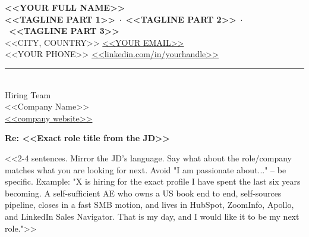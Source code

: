 \documentclass[11pt, letterpaper]{article}
\begin{document}
\begin{center}
  {\huge\bfseries\color{darkgray} <<YOUR FULL NAME>>}\\[4pt]
  {\small\color{medgray}
    \textbf{<<TAGLINE PART 1>>}~$\cdot$~\textbf{<<TAGLINE PART 2>>}~$\cdot$~\textbf{<<TAGLINE PART 3>>}
  }\\[4pt]
  {\small\color{medgray}
    <<CITY, COUNTRY>> \quad\textbar\quad
    \href{mailto:<<YOUR EMAIL>>}{<<YOUR EMAIL>>}\\[2pt]
    <<YOUR PHONE>> \quad\textbar\quad
    \href{<<FULL LINKEDIN URL>>}{<<linkedin.com/in/yourhandle>>}
  }
\end{center}

\vspace{6pt}
{\color{lightgray}\rule{\textwidth}{0.5pt}}
\vspace{6pt}

\\[10pt]

\noindent Hiring Team\\
<<Company Name>>\\
\href{<<company website>>}{<<company website>>}

\vspace{6pt}

\noindent\textbf{Re: <<Exact role title from the JD>>}


<<2-4 sentences. Mirror the JD's language. Say what about the role/company
matches what you are looking for next. Avoid "I am passionate about..." --
be specific. Example:
"X is hiring for the exact profile I have spent the last six years becoming.
A self-sufficient AE who owns a US book end to end, self-sources pipeline,
closes in a fast SMB motion, and lives in HubSpot, ZoomInfo, Apollo, and
LinkedIn Sales Navigator. That is my day, and I would like it to be my next role.">>
\end{document}
